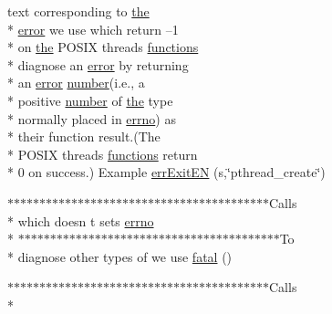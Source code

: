 \begin{DoxyCompactItemize}
text corresponding to \hyperlink{ClientServer_2server_2Makefile_a09c6b60bb7451f9136e25140ffdff6bd}{the} \\*
\hyperlink{common_2README_a80171b13188418b4328f9247d3aff3d2}{error} we use which return –1 \\*
on \hyperlink{ClientServer_2server_2Makefile_a09c6b60bb7451f9136e25140ffdff6bd}{the} P\-O\-S\-I\-X threads \hyperlink{common_2README_a853571ba73c010b99ff2788a0cfe4395}{functions} \\*
diagnose an \hyperlink{common_2README_a80171b13188418b4328f9247d3aff3d2}{error} by returning \\*
an \hyperlink{common_2README_a80171b13188418b4328f9247d3aff3d2}{error} \hyperlink{common_2README_aba79e3975c1b7da6e77c2f4b561603ae}{number}(i.\-e., a \\*
positive \hyperlink{common_2README_aba79e3975c1b7da6e77c2f4b561603ae}{number} of \hyperlink{ClientServer_2server_2Makefile_a09c6b60bb7451f9136e25140ffdff6bd}{the} type \\*
normally placed in \hyperlink{common_2README_afe75ee0c7e5a90ba6bb38426ea69b996}{errno}) as \\*
their function result.(The \\*
P\-O\-S\-I\-X threads \hyperlink{common_2README_a853571ba73c010b99ff2788a0cfe4395}{functions} return \\*
0 on success.) Example \hyperlink{common_2README_aaa5f75c9c764c204bf342e6b6cc969f6}{err\-Exit\-E\-N} (s,\char`\"{}pthread\-\_\-create\char`\"{})
\item 
$\ast$$\ast$$\ast$$\ast$$\ast$$\ast$$\ast$$\ast$$\ast$$\ast$$\ast$$\ast$$\ast$$\ast$$\ast$$\ast$$\ast$$\ast$$\ast$$\ast$$\ast$$\ast$$\ast$$\ast$$\ast$$\ast$$\ast$$\ast$$\ast$$\ast$$\ast$$\ast$$\ast$$\ast$$\ast$$\ast$$\ast$$\ast$$\ast$$\ast$$\ast$Calls \\*
which doesn t sets \hyperlink{common_2README_afe75ee0c7e5a90ba6bb38426ea69b996}{errno} \\*
$\ast$$\ast$$\ast$$\ast$$\ast$$\ast$$\ast$$\ast$$\ast$$\ast$$\ast$$\ast$$\ast$$\ast$$\ast$$\ast$$\ast$$\ast$$\ast$$\ast$$\ast$$\ast$$\ast$$\ast$$\ast$$\ast$$\ast$$\ast$$\ast$$\ast$$\ast$$\ast$$\ast$$\ast$$\ast$$\ast$$\ast$$\ast$$\ast$$\ast$$\ast$To \\*
diagnose other types of we use \hyperlink{common_2README_ae688a97aa2b3eb3a27322a140be60049}{fatal} ()
\item 
$\ast$$\ast$$\ast$$\ast$$\ast$$\ast$$\ast$$\ast$$\ast$$\ast$$\ast$$\ast$$\ast$$\ast$$\ast$$\ast$$\ast$$\ast$$\ast$$\ast$$\ast$$\ast$$\ast$$\ast$$\ast$$\ast$$\ast$$\ast$$\ast$$\ast$$\ast$$\ast$$\ast$$\ast$$\ast$$\ast$$\ast$$\ast$$\ast$$\ast$$\ast$Calls \\*

\end{DoxyCompactItemize}
